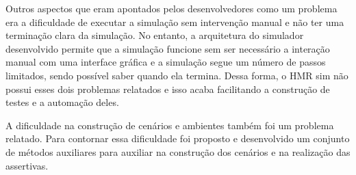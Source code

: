 Outros aspectos que eram apontados pelos desenvolvedores como um problema era a dificuldade de executar a simulação sem intervenção manual e não ter uma terminação clara da simulação. No entanto, a arquitetura do simulador desenvolvido permite que a simulação funcione sem ser necessário a interação manual com uma interface gráfica e a simulação segue um número de passos limitados, sendo possível saber quando ela termina. Dessa forma, o HMR sim não possui esses dois problemas relatados e isso acaba facilitando a construção de testes e a automação deles.

A dificuldade na construção de cenários e ambientes também foi um problema relatado. Para contornar essa dificuldade foi proposto e desenvolvido um conjunto de métodos auxiliares para auxiliar na construção dos cenários e na realização das assertivas.

